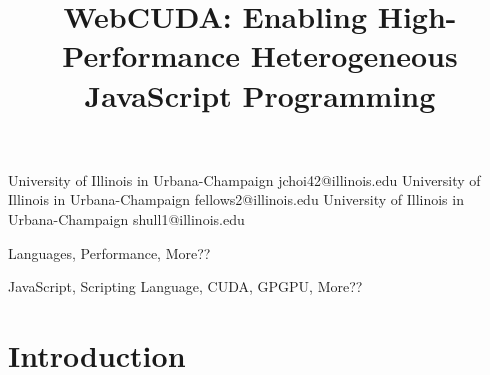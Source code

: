 \documentclass[10pt,reprint]{sigplanconf}
\begin{document}
\setlength{\pdfpageheight}{\paperheight}
\setlength{\pdfpagewidth}{\paperwidth}




\permissiontopublish             %


\title{WebCUDA: Enabling High-Performance Heterogeneous JavaScript Programming}

           {University of Illinois in Urbana-Champaign}
           {jchoi42@illinois.edu}
           {University of Illinois in Urbana-Champaign}
           {fellows2@illinois.edu}
           {University of Illinois in Urbana-Champaign}
           {shull1@illinois.edu}

\maketitle

\begin{abstract}
	
\end{abstract}


\terms
Languages, Performance, More??

\keywords
JavaScript, Scripting Language, CUDA, GPGPU, More??

\section{Introduction}
\label{intro}

\end{document}
